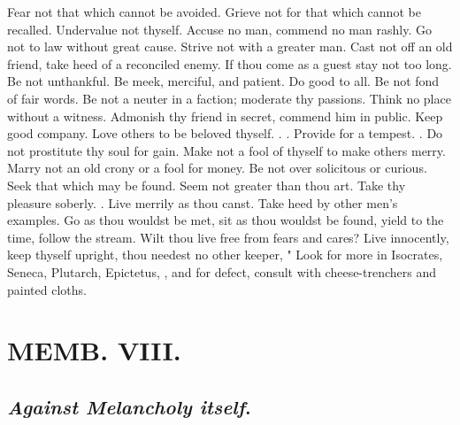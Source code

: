 {Fear not that which cannot be avoided. Grieve not for that which cannot be recalled. Undervalue not thyself. Accuse no man, commend no man rashly. Go not to law without great cause. Strive not with a greater man. Cast not off an old friend, take heed of a reconciled enemy. If thou come as a guest stay not too long. Be not unthankful. Be meek, merciful, and patient. Do good to all. Be not fond of fair words. Be not a neuter in a faction; moderate thy passions. Think no place without a witness. Admonish thy friend in secret, commend him in public. Keep good company. Love others to be beloved thyself. . . Provide for a tempest. . Do not prostitute thy soul for gain. Make not a fool of thyself to make others merry. Marry not an old crony or a fool for money. Be not over solicitous or curious. Seek that which may be found. Seem not greater than thou art. Take thy pleasure soberly. . Live merrily as thou canst. Take heed by other men's examples. Go as thou wouldst be met, sit as thou wouldst be found, yield to the time, follow the stream. Wilt thou live free from fears and cares? Live innocently, keep thyself upright, thou needest no other keeper, \etc{}" Look for more in Isocrates, Seneca, Plutarch, Epictetus, \etc{}, and for defect, consult with cheese-trenchers and painted cloths.

\chapter{ MEMB. VIII.}


\section{\emph{Against Melancholy itself}.}


}

